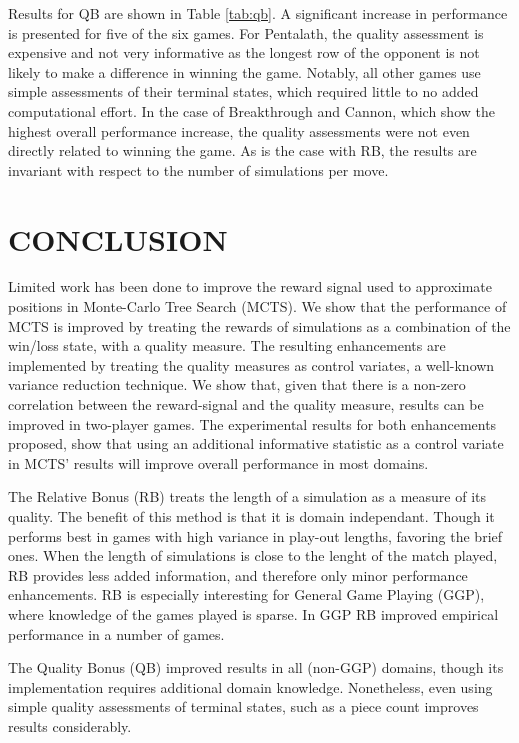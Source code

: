 \documentclass{ecai2014}
\begin{document}
Results for QB are shown in Table \ref{tab:qb}. A significant increase in performance is presented for five of the six games. For Pentalath, the quality assessment is expensive and not very informative as the longest row of the opponent is not likely to make a difference in winning the game. Notably, all other games use simple assessments of their terminal states, which required little to no added computational effort. In the case of Breakthrough and Cannon, which show the highest overall performance increase, the quality assessments were not even directly related to winning the game. As is the case with RB, the results are invariant with respect to the number of simulations per move.

\section{CONCLUSION}
\label{sec:concl}
Limited work has been done to improve the reward signal used to approximate positions in Monte-Carlo Tree Search (MCTS). We show that the performance of MCTS is improved by treating the rewards of simulations as a combination of the win/loss state, with a quality measure. The resulting enhancements are implemented by treating the quality measures as control variates, a well-known variance reduction technique. We show that, given that there is a non-zero correlation between the reward-signal and the quality measure, results can be improved in two-player games. The experimental results for both enhancements proposed, show that using an additional informative statistic as a control variate in MCTS' results will improve overall performance in most domains.

The Relative Bonus (RB) treats the length of a simulation as a measure of its quality. The benefit of this method is that it is domain independant. Though it performs best in games with high variance in play-out lengths, favoring the brief ones. When the length of simulations is close to the lenght of the match played, RB provides less added information, and therefore only minor performance enhancements. RB is especially interesting for General Game Playing (GGP), where knowledge of the games played is sparse. In GGP RB improved empirical performance in a number of games.

The Quality Bonus (QB) improved results in all (non-GGP) domains, though its implementation requires additional domain knowledge. Nonetheless, even using simple quality assessments of terminal states, such as a piece count improves results considerably.
\end{document}
